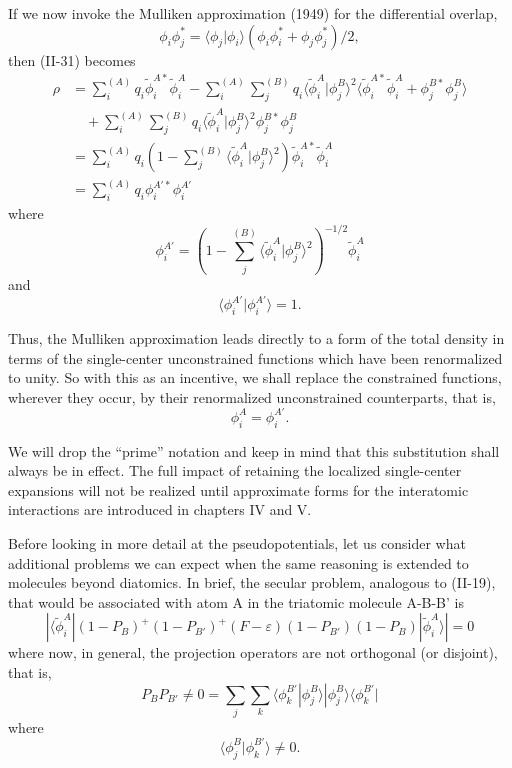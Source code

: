 \documentclass[12pt,letterpaper]{report}
\begin{document}
If we now invoke the Mulliken approximation (1949) for the differential overlap,
\begin{equation}
\phi_i \phi_j^* = \langle \phi_j | \phi_i \rangle (\phi_i \phi_i^* + \phi_j \phi_j^*)/2,
\end{equation}
then (II-31) becomes
\begin{align}
\rho &= \sum_i^{(A)} q_i \tilde{\phi}_i^{A*} \tilde{\phi}_i^A - \sum_i^{(A)} \sum_j^{(B)} q_i \langle \tilde{\phi}_i^A | \phi_j^B \rangle^2 \langle \tilde{\phi}_i^{A*} \tilde{\phi}_i^A + \phi_j^{B*} \phi_j^B \rangle \nonumber\\
&\quad + \sum_i^{(A)} \sum_j^{(B)} q_i \langle \tilde{\phi}_i^A | \phi_j^B \rangle^2 \phi_j^{B*} \phi_j^B \nonumber\\
&= \sum_i^{(A)} q_i \left(1 - \sum_j^{(B)} \langle \tilde{\phi}_i^A | \phi_j^B \rangle^2\right) \tilde{\phi}_i^{A*} \tilde{\phi}_i^A \nonumber\\
&= \sum_i^{(A)} q_i \phi_i^{A'*} \phi_i^{A'}
\end{align}
where
\begin{equation}
\phi_i^{A'} = \left(1 - \sum_j^{(B)} \langle \tilde{\phi}_i^A | \phi_j^B \rangle^2\right)^{-1/2} \tilde{\phi}_i^A
\end{equation}
and
\begin{equation}
\langle \phi_i^{A'} | \phi_i^{A'} \rangle = 1.
\end{equation}

Thus, the Mulliken approximation leads directly to a form of the total density in terms of the single-center unconstrained functions which have been renormalized to unity. So with this as an incentive, we shall replace the constrained functions, wherever they occur, by their renormalized unconstrained counterparts, that is,
\begin{equation}
\phi_i^A = \phi_i^{A'}.
\end{equation}

We will drop the ``prime'' notation and keep in mind that this substitution shall always be in effect. The full impact of retaining the localized single-center expansions will not be realized until approximate forms for the interatomic interactions are introduced in chapters IV and V.

Before looking in more detail at the pseudopotentials, let us consider what additional problems we can expect when the same reasoning is extended to molecules beyond diatomics. In brief, the secular problem, analogous to (II-19), that would be associated with atom A in the triatomic molecule A-B-B' is
\begin{equation}
|\langle \tilde{\phi}_i^A | (1 - P_B)^+ (1 - P_{B'})^+ (F - \varepsilon) (1 - P_{B'}) (1 - P_B) | \tilde{\phi}_i^A \rangle| = 0
\end{equation}
where now, in general, the projection operators are not orthogonal (or disjoint), that is,
\begin{equation}
P_B P_{B'} \neq 0 = \sum_j \sum_k \langle \phi_k^{B'} | \phi_j^B \rangle |\phi_j^B \rangle \langle \phi_k^{B'}|
\end{equation}
where
\begin{equation}
\langle \phi_j^B | \phi_k^{B'} \rangle \neq 0.
\end{equation}
\end{document}
